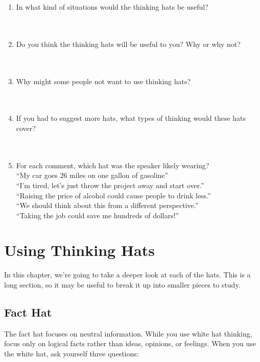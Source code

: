 \begin{enumerate}
	\item In what kind of situations would the thinking hats be useful? ~\\~\\~\\
	\item Do you think the thinking hats will be useful to you? Why or why not? ~\\~\\~\\
	\item Why might some people not want to use thinking hats? ~\\~\\~\\
	\item If you had to suggest more hats, what types of thinking would these hats cover? ~\\~\\~\\
	\item For each comment, which hat was the speaker likely wearing? \\
	``My car goes 26 miles on one gallon of gasoline'' \\
	``I'm tired, let's just throw the project away and start over.'' \\
	``Raising the price of alcohol could cause people to drink less.'' \\
	``We should think about this from a different perspective.'' \\
	``Taking the job could save me hundreds of dollars!''
\end{enumerate}

\chapter{Using Thinking Hats}


In this chapter, we're going to take a deeper look at each of the hats. This is a long section, so it may be useful to break it up into smaller pieces to study.

\section*{Fact Hat}

The fact hat focuses on neutral information. While you use white hat thinking, focus only on logical facts rather than ideas, opinions, or feelings. When you use the white hat, ask yourself three questions:

